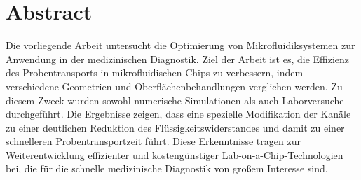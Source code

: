\chapter*{Abstract}
Die vorliegende Arbeit untersucht die Optimierung von Mikrofluidiksystemen zur Anwendung in der medizinischen Diagnostik. Ziel der Arbeit ist es, die Effizienz des Probentransports in mikrofluidischen Chips zu verbessern, indem verschiedene Geometrien und Oberflächenbehandlungen verglichen werden. Zu diesem Zweck wurden sowohl numerische Simulationen als auch Laborversuche durchgeführt. Die Ergebnisse zeigen, dass eine spezielle Modifikation der Kanäle zu einer deutlichen Reduktion des Flüssigkeitswiderstandes und damit zu einer schnelleren Probentransportzeit führt. Diese Erkenntnisse tragen zur Weiterentwicklung effizienter und kostengünstiger Lab-on-a-Chip-Technologien bei, die für die schnelle medizinische Diagnostik von großem Interesse sind.
\newpage


